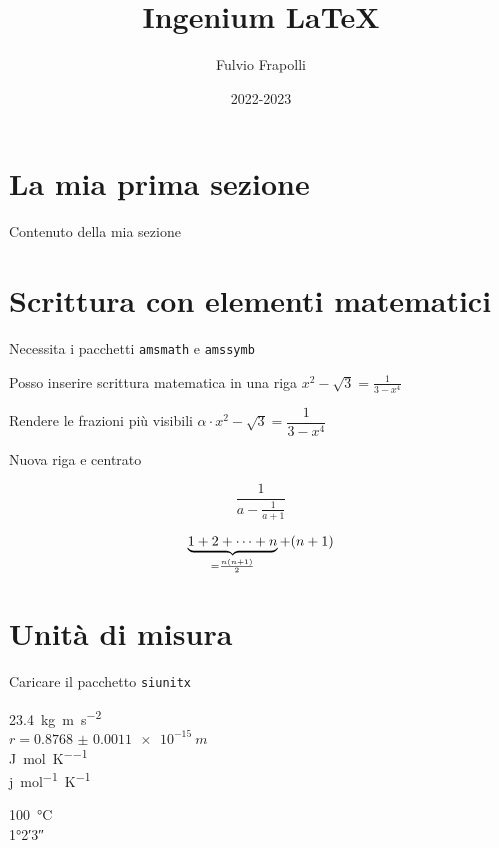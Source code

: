 \documentclass[a4paper,12pt]{article} %
\author{Fulvio Frapolli} %
\title{Ingenium \LaTeX}%
\date{2022-2023} %
\begin{document}
    
\maketitle%

\tableofcontents %
\newpage %

\section{La mia prima sezione} %

Contenuto della mia sezione

\section{Scrittura con elementi matematici}

Necessita i pacchetti \verb |amsmath| e \verb|amssymb|

Posso inserire scrittura matematica in una riga $x^2-\sqrt{3}=\frac{1}{3-x^4}$

Rendere le frazioni più visibili  $\alpha \cdot  x^2-\sqrt{3}=\dfrac{1}{3-x^4}$

Nuova riga e centrato 

\[
\frac{1}{a-\frac{1}{a+1}}    
\]


\[
\underbrace{1+2+\dots+n}_%
{=\frac{n(n+1)}{2}}
+(n+1)
\]


\section{Unità di misura}

Caricare il pacchetto \verb|siunitx|

\qty{23.4}{kg.m.s^{-2}} \\
$r=\qty{0.8768(11)e-15}{m}$ \\
\unit{\joule\per\mole\per\kelvin}\\
\unit{j.mol^{-1}.K^{-1}}


\qty{100}{\celsius} \\
\ang{1;2;3}
\end{document}
